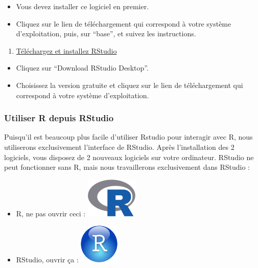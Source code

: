 \documentclass[a4paperpaper,]{article}
\providecommand{\tightlist}{%
  \setlength{\itemsep}{0pt}\setlength{\parskip}{0pt}}
\begin{document}
\begin{itemize}
\tightlist
\item
  Vous devez installer ce logiciel en premier.
\item
  Cliquez sur le lien de téléchargement qui correspond à votre système d'exploitation, puis, sur ``base'', et suivez les instructions.
\end{itemize}

\begin{enumerate}
\def\labelenumi{\arabic{enumi}.}
\setcounter{enumi}{1}
\tightlist
\item
  \href{https://www.rstudio.com/products/RStudio/\#Desktop}{Téléchargez et installez RStudio}
\end{enumerate}

\begin{itemize}
\tightlist
\item
  Cliquez sur ``Download RStudio Desktop''.
\item
  Choisissez la version gratuite et cliquez sur le lien de téléchargement qui correspond à votre système d'exploitation.
\end{itemize}

\hypertarget{utiliser-r-depuis-rstudio}{%
\subsubsection{Utiliser R depuis RStudio}\label{utiliser-r-depuis-rstudio}}

Puisqu'il est beaucoup plus facile d'utiliser Rstudio pour interagir avec R, nous utiliserons exclusivement l'interface de RStudio. Après l'installation des 2 logiciels, vous disposez de 2 nouveaux logiciels sur votre ordinateur. RStudio ne peut fonctionner sans R, mais nous travaillerons exclusivement dans RStudio :

\begin{itemize}
\tightlist
\item
  R, ne pas ouvrir ceci : \includegraphics{images/Rlogo.png}
\item
  RStudio, ouvrir ça : \includegraphics{images/RStudio-Ball.png}
\end{itemize}
\end{document}
